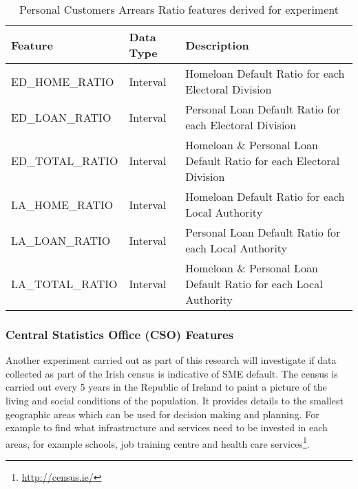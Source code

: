 \begin{table}[H]
	\centering
	\small
	\resizebox{\textwidth}{!}
	{
		\begin{tabular}{|l|l|l|}
			\hline
			\textbf{Feature} & \textbf{Data Type} & \textbf{Description}                                                                                                                                                                                                                                                                                                                                                                                                                                                                                                                              \\ \hline
			ED\_HOME\_RATIO  & Interval & Homeloan Default Ratio for each Electoral Division \\ \hline
			ED\_LOAN\_RATIO  & Interval & Personal Loan Default Ratio for each Electoral Division \\ \hline
			ED\_TOTAL\_RATIO & Interval & Homeloan \& Personal Loan Default Ratio for each Electoral Division \\ \hline
			LA\_HOME\_RATIO  & Interval & Homeloan Default Ratio for each Local Authority \\ \hline
			LA\_LOAN\_RATIO  & Interval & Personal Loan Default Ratio for each Local Authority \\ \hline
			LA\_TOTAL\_RATIO & Interval & Homeloan \& Personal Loan Default Ratio for each Local Authority \\ \hline
		\end{tabular}
	}
	\caption{Personal Customers Arrears Ratio features derived for experiment}
	\label{table:arrears_ratio}
\end{table}

\subsubsection{Central Statistics Office (CSO) Features}
Another experiment carried out as part of this research will investigate if data collected as part of the Irish census is indicative of SME default. The census is carried out every 5 years in the Republic of Ireland to paint a picture of the living and social conditions of the population. It provides details to the smallest geographic areas which can be used for decision making and planning. For example to find what infrastructure and services need to be invested in each areas, for example schools, job training centre and health care services\footnote{\url{http://census.ie/}}. 

